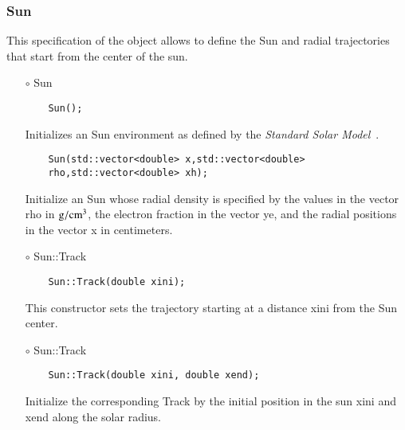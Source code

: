 \subsubsection{{Sun}}
This specification of the object allows to define the Sun and radial
trajectories that start from the center of the sun.
\begin{itemize}
\item[$\circ$] {\ttf Sun}
  \begin{lstlisting}
    Sun();
  \end{lstlisting}
  Initializes an {\ttf Sun} environment as defined by the {\it
    Standard Solar Model}~\citep{bahcall2005new}.
  
  \begin{lstlisting}
    Sun(std::vector<double> x,std::vector<double>
    rho,std::vector<double> xh);
  \end{lstlisting}
  Initialize an {\ttf Sun} whose radial density is specified by the
  values in the vector {\ttf rho} in ${\rm g}/{\rm cm}^3$, the
  electron fraction in the vector {\ttf ye}, and the radial positions
  in the vector {\ttf x} in centimeters. 
  
\item[$\circ$] {\ttf Sun::Track}
  \begin{lstlisting}
    Sun::Track(double xini);
  \end{lstlisting}
  This constructor sets the trajectory starting at a distance 
  {\ttf xini} from the Sun center.
  \item[$\circ$] {\ttf Sun::Track}
  \begin{lstlisting}
    Sun::Track(double xini, double xend);
  \end{lstlisting}
  Initialize the corresponding {\ttf Track} by the initial position in the sun {\ttf xini} and {\ttf xend} along the solar radius.
\end{itemize}



